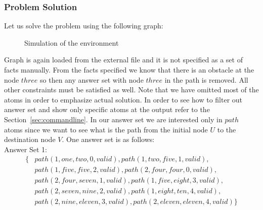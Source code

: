 \documentclass[a4paper, titlepage]{article}
\begin{document}
\subsubsection{Problem Solution} 
Let us solve the problem using the following graph:  
\begin{figure}
\begin{center}
\end{center}
\caption{Simulation of the environment}
\end{figure}
Graph is again loaded from the external file and it is not 
specified as a set of facts manually. From the facts 
specified we know that there is an obstacle at the node 
$\mathit{three}$ so then any answer set with node 
$\mathit{three}$ in the path is removed. All other 
constraints must be satisfied as well. Note that we have 
omitted most of the atoms in order to emphasize actual 
solution. In order to see how to filter out answer set and 
show only specific atoms at the output refer to the 
Section~\ref{sec:commandline}. In our answer set we are 
interested only in $\mathit{path}$ atoms since we want to 
see what is the path from the initial node $U$ to the 
destination node $V$. One answer set is as follows:
\\Answer Set 1:
\begin{align*}
\{ & path(1,one,two,0,valid), path(1,two,five,1,valid),
\\ & path(1,five,five,2,valid), path(2,four,four,0,valid),
\\ & path(2,four,seven,1,valid), 
path(1,five,eight,3,valid),
\\ & path(2,seven,nine,2,valid), path(1,eight,ten,4,valid),
\\ & 
path(2,nine,eleven,3,valid),path(2,eleven,eleven,4,valid) 
\}
\end{align*} 
\end{document}
